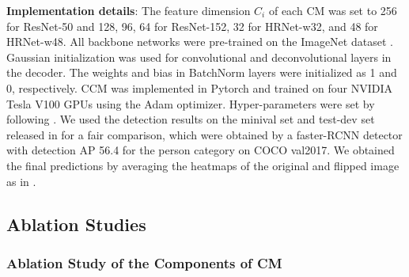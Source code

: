 \documentclass[twocolumn]{svjour3}          \smartqed  \usepackage{natbib}
\begin{document}
\textbf{Implementation details}: The feature dimension $C_i$ of each CM was set to 256 for ResNet-50 and 128, 96, 64 for ResNet-152, 32 for HRNet-w32, and 48 for HRNet-w48. All backbone networks were pre-trained on the ImageNet dataset \citep{deng2009imagenet}. Gaussian initialization was used for convolutional and deconvolutional layers in the decoder. The weights and bias in BatchNorm layers were initialized as 1 and 0, respectively. CCM was implemented in Pytorch \citep{paszke2017automatic} and trained on four NVIDIA Tesla V100 GPUs using the Adam optimizer. Hyper-parameters were set by following \citep{xiao2018simple, sun2019deep}. We used the detection results on the minival set and test-dev set released in \citep{xiao2018simple} for a fair comparison, which were obtained by a faster-RCNN detector \citep{ren2015faster} with detection AP 56.4 for the person category on COCO val2017. We obtained the final predictions by averaging the heatmaps of the original and flipped image as in \citep{chen2018cascaded, newell2016stacked, xiao2018simple}.

\subsection{Ablation Studies}
\label{subsec:ablation}

\subsubsection{Ablation Study of the Components of CM}
\label{subsubsec:ablationmcm}
\end{document}
